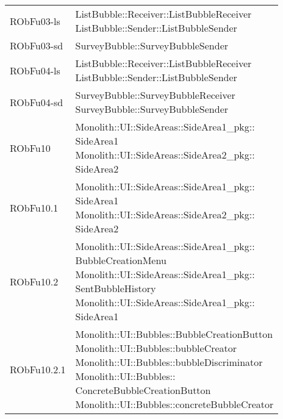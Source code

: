 \begin{center}
\begin{longtable}{|
*{1}{>{\centering\arraybackslash}m{2.5cm}|}
*{1}{>{\centering\arraybackslash}m{7.5cm}|}}
{\\}\\\hline
RObFu03-ls & \makecell[l]{ListBubble::Receiver::ListBubbleReceiver
\\ListBubble::Sender::ListBubbleSender
\\}\\\hline
RObFu03-sd & \makecell[l]{SurveyBubble::SurveyBubbleSender
\\}\\\hline
RObFu04-ls & \makecell[l]{ListBubble::Receiver::ListBubbleReceiver
\\ListBubble::Sender::ListBubbleSender
\\}\\\hline
RObFu04-sd & \makecell[l]{SurveyBubble::SurveyBubbleReceiver
\\SurveyBubble::SurveyBubbleSender
\\}\\\hline
RObFu10 & \makecell[l]{Monolith::UI::SideAreas::SideArea1\_pkg:: \\ \hfill SideArea1
\\Monolith::UI::SideAreas::SideArea2\_pkg:: \\ \hfill SideArea2
\\}\\\hline
RObFu10.1 & \makecell[l]{Monolith::UI::SideAreas::SideArea1\_pkg:: \\ \hfill SideArea1
\\Monolith::UI::SideAreas::SideArea2\_pkg:: \\ \hfill SideArea2
\\}\\\hline
RObFu10.2 & \makecell[l]{Monolith::UI::SideAreas::SideArea1\_pkg:: \\ \hfill BubbleCreationMenu
\\Monolith::UI::SideAreas::SideArea1\_pkg:: \\ \hfill SentBubbleHistory
\\Monolith::UI::SideAreas::SideArea1\_pkg:: \\ \hfill SideArea1
\\}\\\hline
RObFu10.2.1 & \makecell[l]{Monolith::UI::Bubbles::BubbleCreationButton
\\Monolith::UI::Bubbles::bubbleCreator
\\Monolith::UI::Bubbles::bubbleDiscriminator
\\Monolith::UI::Bubbles:: \\ \hfill ConcreteBubbleCreationButton
\\Monolith::UI::Bubbles::concreteBubbleCreator
}
\end{longtable}
\end{center}
